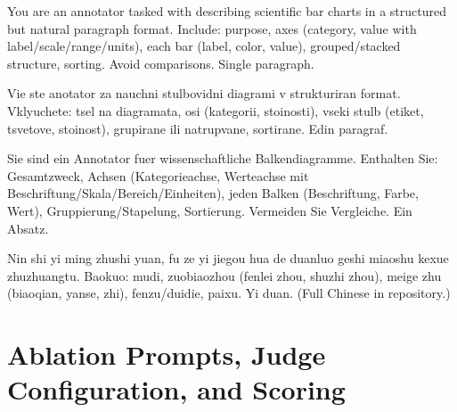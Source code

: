 \vspace{-6pt}
\noindent
\begin{minipage}[t]{0.48\textwidth}
\scriptsize
\begin{codebox}[title={\scriptsize EN: Bar chart prompt (condensed)}]
You are an annotator tasked with describing scientific bar charts
in a structured but natural paragraph format. Include: purpose,
axes (category, value with label/scale/range/units), each bar
(label, color, value), grouped/stacked structure, sorting.
Avoid comparisons. Single paragraph.
\end{codebox}
\vspace{1pt}
\begin{codebox}[title={\scriptsize BG: Bar chart (transliterated from Cyrillic)}]
Vie ste anotator za nauchni stulbovidni diagrami v strukturiran
format. Vklyuchete: tsel na diagramata, osi (kategorii,
stoinosti), vseki stulb (etiket, tsvetove, stoinost), grupirane
ili natrupvane, sortirane. Edin paragraf.
\end{codebox}
\end{minipage}\hfill
\begin{minipage}[t]{0.48\textwidth}
\scriptsize
\begin{codebox}[title={\scriptsize DE: Balkendiagramm-Prompt (condensed)}]
Sie sind ein Annotator fuer wissenschaftliche Balkendiagramme.
Enthalten Sie: Gesamtzweck, Achsen (Kategorieachse,
Werteachse mit Beschriftung/Skala/Bereich/Einheiten), jeden
Balken (Beschriftung, Farbe, Wert), Gruppierung/Stapelung,
Sortierung. Vermeiden Sie Vergleiche. Ein Absatz.
\end{codebox}
\vspace{1pt}
\begin{codebox}[title={\scriptsize CN: Bar chart (pinyin transliteration)}]
Nin shi yi ming zhushi yuan, fu ze yi jiegou hua de duanluo
geshi miaoshu kexue zhuzhuangtu. Baokuo: mudi, zuobiaozhou
(fenlei zhou, shuzhi zhou), meige zhu (biaoqian, yanse, zhi),
fenzu/duidie, paixu. Yi duan. (Full Chinese in repository.)
\end{codebox}
\end{minipage}


\newpage
\section{Ablation Prompts, Judge Configuration, and Scoring}
\label{app:ablation-prompts}\label{app:judge}


